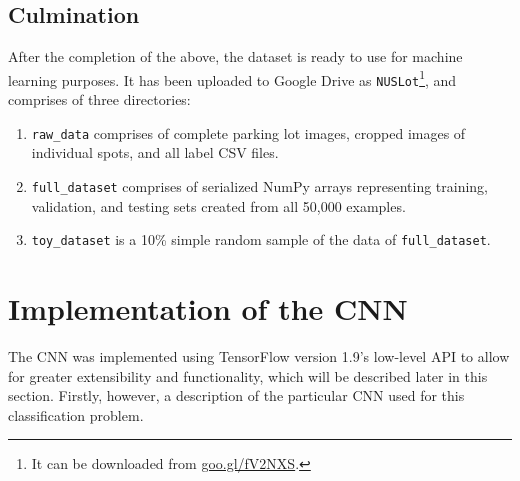 \documentclass[a4paper, 11pt]{article} %
\begin{document}
	\subsection{Culmination}
		After the completion of the above, the dataset is ready to use for 
		machine learning purposes. It
		has been uploaded to Google Drive as \texttt{NUSLot}\footnote{It can be 
		downloaded from \hyperlink{https://goo.gl/fV2NXS}{goo.gl/fV2NXS}.}, and 
		comprises of 
		three directories:
		\begin{enumerate}
			\item \texttt{raw\_data} comprises of complete parking lot 
			images, cropped images of individual spots, and all label CSV files.
			\item \texttt{full\_dataset} comprises of serialized NumPy arrays 
			representing
			training, validation, and testing sets created from all 50,000 examples. 
			\item \texttt{toy\_dataset} is a 10\% simple random sample of the 
			data of
			\texttt{full\_dataset}.
		\end{enumerate}

\section{Implementation of the CNN}
	The CNN was implemented using TensorFlow version 1.9's low-level API to
	allow for greater extensibility and functionality, which will be described 
	later in this section. Firstly, however, a description of the particular 
	CNN used for this classification problem.
\end{document}
